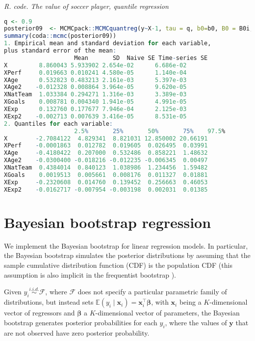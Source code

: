 \begin{tcolorbox}[enhanced,width=4.67in,center upper,
	fontupper=\large\bfseries,drop shadow southwest,sharp corners]
	\textit{R. code. The value of soccer player, quantile regression}
	\begin{VF}
		\begin{lstlisting}[language=R]
q <- 0.9
posterior09  <- MCMCpack::MCMCquantreg(y~X-1, tau = q, b0=b0, B0 = B0i, burnin = burnin, mcmc = mcmc, thin = thin)
summary(coda::mcmc(posterior09))
1. Empirical mean and standard deviation for each variable,
plus standard error of the mean:
					Mean       SD  Naive SE Time-series SE
X         8.860043 5.933902 2.654e-02      6.686e-02
XPerf     0.019663 0.010241 4.580e-05      1.140e-04
XAge      0.532823 0.483213 2.161e-03      5.397e-03
XAge2    -0.012328 0.008864 3.964e-05      9.620e-05
XNatTeam  1.033384 0.294271 1.316e-03      3.389e-03
XGoals    0.008781 0.004340 1.941e-05      4.991e-05
XExp      0.132760 0.177677 7.946e-04      2.125e-03
XExp2    -0.002713 0.007639 3.416e-05      8.531e-05
2. Quantiles for each variable:
					2.5%       25%       50%       75%    97.5%
X        -2.7084122  4.829341  8.821031 12.850002 20.66191
XPerf    -0.0001863  0.012782  0.019605  0.026495  0.03991
XAge     -0.4180422  0.207000  0.532486  0.858221  1.48632
XAge2    -0.0300400 -0.018216 -0.012235 -0.006345  0.00497
XNatTeam  0.4384014  0.840123  1.038986  1.234456  1.59482
XGoals    0.0019513  0.005661  0.008176  0.011327  0.01881
XExp     -0.2320608  0.014760  0.139452  0.256663  0.46053
XExp2    -0.0162717 -0.007954 -0.003198  0.002031  0.01385
\end{lstlisting}
	\end{VF}
\end{tcolorbox} 

\section{Bayesian bootstrap regression}\label{sec610}

We implement the Bayesian bootstrap \cite{Rubin1981} for linear regression models. In particular, the Bayesian bootstrap simulates the posterior distributions by assuming that the sample cumulative distribution function (CDF) is the population CDF (this assumption is also implicit in the frequentist bootstrap \cite{Efron1979}).

Given $y_i \stackrel{i.i.d.}{\sim} \mathcal{F}$, where $\mathcal{F}$ does not specify a particular parametric family of distributions, but instead sets $\mathbb{E}(y_i \mid \bm{x}_i) = \bm{x}_i^{\top} \bm{\beta}$, with $\bm{x}_i$ being a $K$-dimensional vector of regressors and $\bm{\beta}$ a $K$-dimensional vector of parameters, the Bayesian bootstrap generates posterior probabilities for each $y_i$, where the values of $\bm{y}$ that are not observed have zero posterior probability.

